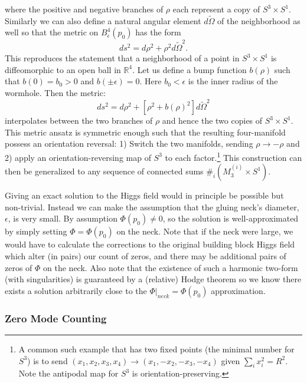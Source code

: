 \documentclass[12pt]{article}%
\numberwithin{equation}{section}
\renewcommand{\(}{\left(}
\renewcommand{\)}{\right)}
\renewcommand{\[}{\left[}
\renewcommand{\]}{\right]}
\begin{document}
where the positive and negative branches of $\rho$ each represent a copy of $S^3\times S^1$. Similarly we can also define a natural angular element $d\widetilde{\Omega}$ of the neighborhood as well so that the metric on $B^4_\epsilon(p_0)$ has the form
\begin{equation}
ds^2=d\rho^2+\rho^2 d\widetilde{\Omega}^2.
\end{equation}
This reproduces the statement that a neighborhood of a point in $S^3\times S^1$ is diffeomorphic to an open ball in $\mathbb{R}^4$. Let us define a bump function $b(\rho)$ such that $b(0)=b_0>0$ and $b(\pm \epsilon)=0$. Here $b_0<\epsilon$ is the inner radius of the wormhole. Then the metric:
\begin{equation}
ds^2=d\rho^2+ [ \rho^2 + b(\rho)^2 ] d\widetilde{\Omega}^2
\end{equation}
interpolates between the two branches of $\rho$ and hence the two copies of $S^3\times S^1$. This metric ansatz is symmetric enough such that the resulting four-manifold possess an orientation reversal: 1) Switch the two manifolds, sending $\rho\rightarrow -\rho$ and 2) apply an orientation-reversing map of $S^3$ to each factor.\footnote{A common such example that has two fixed points (the minimal number for $S^3$) is to send $(x_1,x_2,x_3,x_4)\rightarrow (x_1,-x_2,-x_3,-x_4)$ given $\sum_i x^2_i=R^2$. Note the antipodal map for $S^3$ is orientation-preserving.} This construction can then be generalized to any sequence of connected sums $\#_{i}(M^{(i)}_3\times S^1)$.

Giving an exact solution to the Higgs field would in principle be possible but non-trivial. Instead we can make the assumption that the gluing neck's diameter, $\epsilon$, is very small. By assumption $\Phi(p_0)\neq 0$, so the solution is well-approximated by simply setting $\Phi=\Phi(p_0)$ on the neck. Note that if the neck were large, we would have to calculate the corrections to the original building block Higgs field which alter (in pairs) our count of zeros, and there may be additional pairs of zeros of $\Phi$ on the neck. Also note that the existence of such a harmonic two-form (with singularities) is guaranteed by a (relative) Hodge theorem so we know there exists a solution arbitrarily close to the $\Phi|_{neck}=\Phi(p_0)$ approximation.

\subsubsection{Zero Mode Counting}
\end{document}

